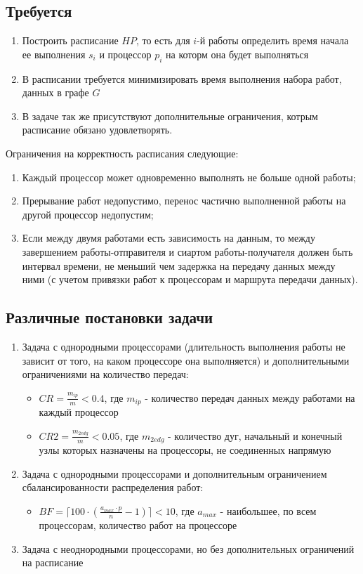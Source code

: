 \subsection*{Требуется}
\begin{enumerate}
    \item Построить расписание $HP$, то есть для $i$-й работы определить время начала ее выполнения $s_i$ и процессор $p_i$ на которм она будет выполняться
    \item В расписании требуется минимизировать время выполнения набора работ, данных в графе $G$
    \item В задаче так же присутствуют дополнительные ограничения, котрым расписание обязано удовлетворять.
\end{enumerate}
Ограничения на корректность расписания следующие:
\begin{enumerate}
    \item Каждый процессор может одновременно выполнять не больше одной работы;
    \item Прерывание работ недопустимо, перенос частично выполненной работы на другой процессор недопустим;
    \item Если между двумя работами есть зависимость на данным, то между завершением работы-отправителя и сиартом работы-получателя должен быть интервал времени, не меньший чем задержка на передачу данных между ними (с учетом привязки работ к процессорам и маршрута передачи данных).
\end{enumerate}
\subsection*{Различные постановки задачи}
\begin{enumerate}
    \item Задача с однородными процессорами (длительность выполнения работы не зависит от того, на каком процессоре она выполняется) и дополнительными ограничениями на количество передач:
          \begin{itemize}
              \item $CR = \frac{m_{ip}}{m} < 0.4$, где $m_{ip}$ - количество передач данных между работами на каждый процессор
              \item $CR2 = \frac{m_{2edg}}{m} < 0.05$, где $m_{2edg}$ - количество дуг, начальный и конечный узлы которых назначены на процессоры, не соединенных напрямую
          \end{itemize}
    \item Задача с однородными процессорами и дополнительным ограничением сбалансированности распределения работ:
          \begin{itemize}
              \item $BF = \lceil 100 \cdot \left( \frac{a_{max} \cdot p}{n} - 1 \right) \rceil < 10$, где $a_{max}$ - наибольшее, по всем процессорам, количество работ на процессоре
          \end{itemize}
    \item Задача с неоднородными процессорами, но без дополнительных ограничений на расписание
\end{enumerate}